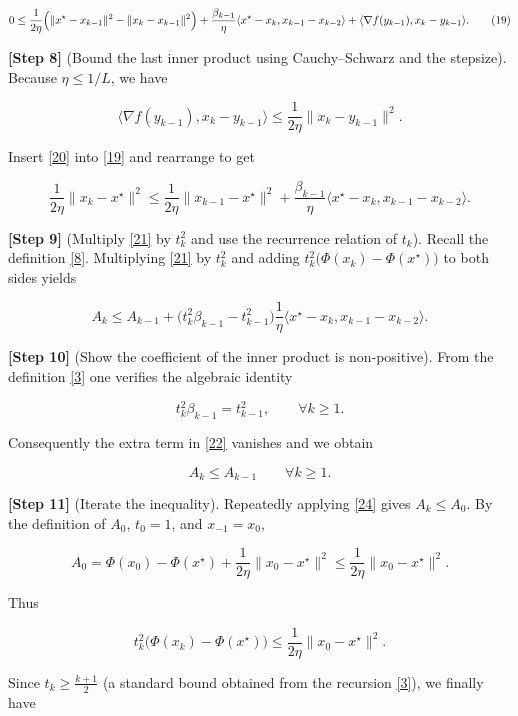 \documentclass{article}
\begin{document}
\[
0\le \frac{1}{2\eta}\Bigl(\|x^{\star}-x_{k-1}\|^{2}-\|x_{k}-x_{k-1}\|^{2}\Bigr)
+\frac{\beta_{k-1}}{\eta}\langle x^{\star}-x_{k}, x_{k-1}-x_{k-2}\rangle
+\langle\nabla f(y_{k-1}),x_{k}-y_{k-1}\rangle . \tag{19}
\]

\noindent\textbf{[Step 8]} (Bound the last inner product using Cauchy–Schwarz and the stepsize).  
Because $\eta\le 1/L$, we have  

\[
\langle\nabla f(y_{k-1}),x_{k}-y_{k-1}\rangle
\le \frac{1}{2\eta}\|x_{k}-y_{k-1}\|^{2} . \tag{20}
\]

Insert \eqref{20} into \eqref{19} and rearrange to get  

\[
\frac{1}{2\eta}\|x_{k}-x^{\star}\|^{2}
\le \frac{1}{2\eta}\|x_{k-1}-x^{\star}\|^{2}
+\frac{\beta_{k-1}}{\eta}\langle x^{\star}-x_{k}, x_{k-1}-x_{k-2}\rangle . \tag{21}
\]

\noindent\textbf{[Step 9]} (Multiply \eqref{21} by $t_{k}^{2}$ and use the recurrence relation of $t_{k}$).  
Recall the definition \eqref{8}. Multiplying \eqref{21} by $t_{k}^{2}$ and adding $t_{k}^{2}\bigl(\Phi(x_{k})-\Phi(x^{\star})\bigr)$ to both sides yields  

\[
A_{k}\le A_{k-1}+ \bigl(t_{k}^{2}\beta_{k-1}-t_{k-1}^{2}\bigr)\frac{1}{\eta}\langle x^{\star}-x_{k}, x_{k-1}-x_{k-2}\rangle . \tag{22}
\]

\noindent\textbf{[Step 10]} (Show the coefficient of the inner product is non‑positive).  
From the definition \eqref{3} one verifies the algebraic identity  

\[
t_{k}^{2}\beta_{k-1}=t_{k-1}^{2},\qquad\forall k\ge1. \tag{23}
\]

Consequently the extra term in \eqref{22} vanishes and we obtain  

\[
A_{k}\le A_{k-1}\qquad\forall k\ge1. \tag{24}
\]

\noindent\textbf{[Step 11]} (Iterate the inequality).  
Repeatedly applying \eqref{24} gives $A_{k}\le A_{0}$.  By the definition of $A_{0}$, $t_{0}=1$, and $x_{-1}=x_{0}$,  

\[
A_{0}= \Phi(x_{0})-\Phi(x^{\star})+\frac{1}{2\eta}\|x_{0}-x^{\star}\|^{2}\le \frac{1}{2\eta}\|x_{0}-x^{\star}\|^{2}.
\]

Thus  

\[
t_{k}^{2}\bigl(\Phi(x_{k})-\Phi(x^{\star})\bigr)
\le \frac{1}{2\eta}\|x_{0}-x^{\star}\|^{2}. \tag{25}
\]

Since $t_{k}\ge \frac{k+1}{2}$ (a standard bound obtained from the recursion \eqref{3}), we finally have  
\end{document}

